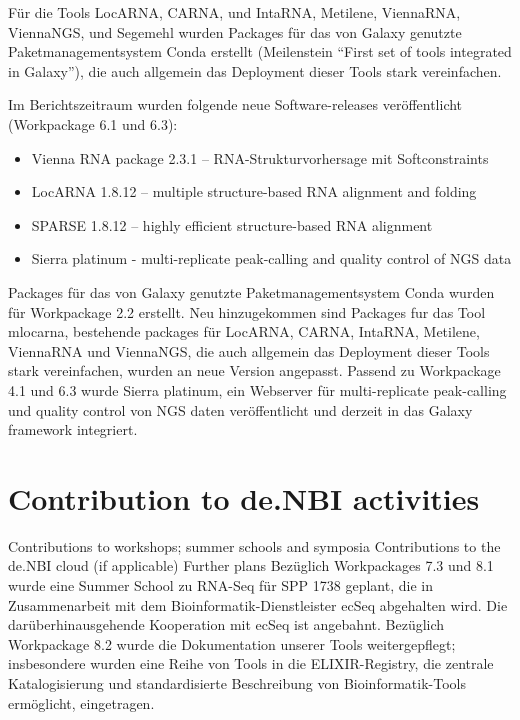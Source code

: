 \documentclass{article}
\begin{document}
F\"ur die Tools LocARNA, CARNA, und IntaRNA, Metilene, ViennaRNA,
ViennaNGS, und Segemehl wurden Packages für das von Galaxy genutzte
Paketmanagementsystem Conda erstellt (Meilenstein “First set of tools
integrated in Galaxy”), die auch allgemein das Deployment dieser Tools
stark vereinfachen. 

Im Berichtszeitraum wurden folgende neue Software-releases
ver\"offentlicht (Workpackage 6.1 und 6.3):

\begin{itemize}
\item Vienna RNA package 2.3.1 – RNA-Strukturvorhersage mit
  Softconstraints
\item LocARNA 1.8.12 – multiple structure-based RNA alignment and
  folding
\item SPARSE 1.8.12 – highly efficient structure-based RNA alignment
\item Sierra platinum - multi-replicate peak-calling and quality control of NGS data
\end{itemize}

Packages für das von Galaxy genutzte Paketmanagementsystem Conda
wurden für Workpackage 2.2 erstellt. Neu hinzugekommen sind Packages
fur das Tool mlocarna, bestehende packages für LocARNA, CARNA,
IntaRNA, Metilene, ViennaRNA und ViennaNGS, die auch allgemein das
Deployment dieser Tools stark vereinfachen, wurden an neue Version
angepasst.
Passend zu Workpackage 4.1 und
6.3 wurde Sierra platinum, ein Webserver für multi-replicate
peak-calling und quality control von NGS daten veröffentlicht und
derzeit in das Galaxy framework integriert.


\section*{Contribution to de.NBI activities}
\label{sec:activities}
Contributions to workshops; summer schools and symposia
Contributions to the de.NBI cloud  (if applicable)
Further plans
Bez\"uglich Workpackages 7.3 und 8.1 wurde eine
Summer School zu RNA-Seq f\"ur SPP 1738 geplant, die in Zusammenarbeit
mit dem Bioinformatik-Dienstleister ecSeq abgehalten wird. Die
dar\"uberhinausgehende Kooperation mit ecSeq ist angebahnt.
Bez\"uglich Workpackage 8.2 wurde die Dokumentation unserer Tools
weitergepflegt; insbesondere wurden eine Reihe von Tools in die
ELIXIR-Registry, die zentrale Katalogisierung und
standardisierte Beschreibung von Bioinformatik-Tools erm\"oglicht,
eingetragen.
\end{document}
